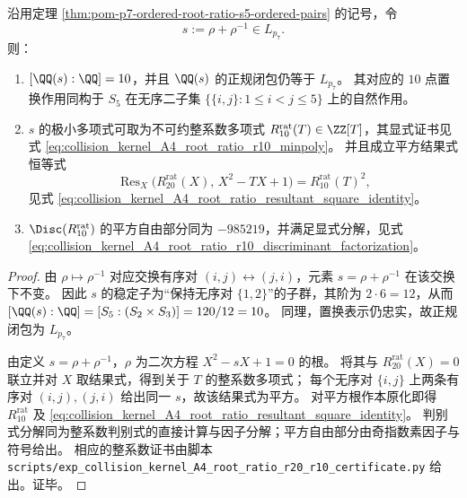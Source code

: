 \begin{theorem}[无序根对十次层与平方结果式]\label{thm:pom-p7-unordered-root-pair-sum-inverse-r10}
沿用定理 \ref{thm:pom-p7-ordered-root-ratio-s5-ordered-pairs} 的记号，令
\[
s:=\rho+\rho^{-1}\in L_{p_7}.
\]
则：
\begin{enumerate}
  \item \([\QQ(s):\QQ]=10\)，并且 \(\QQ(s)\) 的正规闭包仍等于 \(L_{p_7}\)。
  其对应的 \(10\) 点置换作用同构于 \(S_5\) 在无序二子集 \(\{\{i,j\}:1\le i<j\le 5\}\) 上的自然作用。
  \item \(s\) 的极小多项式可取为不可约整系数多项式 \(R_{10}^{\mathrm{rat}}(T)\in\ZZ[T]\)，其显式证书见式 \eqref{eq:collision_kernel_A4_root_ratio_r10_minpoly}。
  并且成立平方结果式恒等式
  \[
  \operatorname{Res}_{X}\!\bigl(R_{20}^{\mathrm{rat}}(X),\,X^2-TX+1\bigr)=R_{10}^{\mathrm{rat}}(T)^2,
  \]
  见式 \eqref{eq:collision_kernel_A4_root_ratio_resultant_square_identity}。
  \item \(\Disc(R_{10}^{\mathrm{rat}})\) 的平方自由部分同为 \(-985219\)，并满足显式分解，见式 \eqref{eq:collision_kernel_A4_root_ratio_r10_discriminant_factorization}。
\end{enumerate}
\end{theorem}





\begin{proof}
由 \(\rho\mapsto\rho^{-1}\) 对应交换有序对 \((i,j)\leftrightarrow(j,i)\)，元素 \(s=\rho+\rho^{-1}\) 在该交换下不变。
因此 \(s\) 的稳定子为“保持无序对 \(\{1,2\}\)”的子群，其阶为 \(2\cdot 6=12\)，从而
\([\QQ(s):\QQ]=[S_5:(S_2\times S_3)]=120/12=10\)。
同理，置换表示仍忠实，故正规闭包为 \(L_{p_7}\)。
\par
由定义 \(s=\rho+\rho^{-1}\)，\(\rho\) 为二次方程 \(X^2-sX+1=0\) 的根。
将其与 \(R_{20}^{\mathrm{rat}}(X)=0\) 联立并对 \(X\) 取结果式，得到关于 \(T\) 的整系数多项式；
每个无序对 \(\{i,j\}\) 上两条有序对 \((i,j),(j,i)\) 给出同一 \(s\)，故该结果式为平方。
对平方根作本原化即得 \(R_{10}^{\mathrm{rat}}\) 及 \eqref{eq:collision_kernel_A4_root_ratio_resultant_square_identity}。
判别式分解同为整系数判别式的直接计算与因子分解；平方自由部分由奇指数素因子与符号给出。
相应的整系数证书由脚本 \texttt{scripts/exp\_collision\_kernel\_A4\_root\_ratio\_r20\_r10\_certificate.py} 给出。证毕。
\end{proof}

